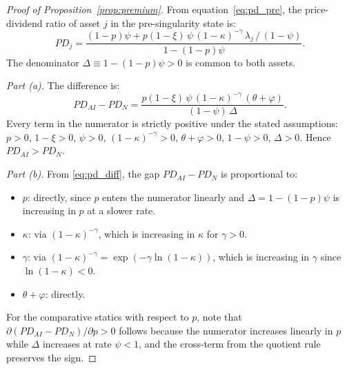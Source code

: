 \documentclass[12pt]{article}
\begin{document}
\begin{proof}[Proof of Proposition~\ref{prop:premium}]
From equation~\eqref{eq:pd_pre}, the price-dividend ratio of asset $j$ in the pre-singularity state is:
\begin{equation}
  PD_j = \frac{(1-p)\psi + p(1-\xi)\,\psi\,(1-\kappa)^{-\gamma}\,\lambda_j\,/\,(1-\psi)}{1 - (1-p)\psi}. \label{eq:pd_proof} %
\end{equation}
The denominator $\Delta \equiv 1 - (1-p)\psi > 0$ is common to both assets.

\emph{Part (a).} The difference is:
\begin{equation}
  PD_{AI} - PD_N = \frac{p(1-\xi)\,\psi\,(1-\kappa)^{-\gamma}\,(\theta + \varphi)}{(1-\psi)\,\Delta}. \label{eq:pd_diff} %
\end{equation}
Every term in the numerator is strictly positive under the stated assumptions: $p > 0$, $1-\xi > 0$, $\psi > 0$, $(1-\kappa)^{-\gamma} > 0$, $\theta + \varphi > 0$, $1 - \psi > 0$, $\Delta > 0$. Hence $PD_{AI} > PD_N$.

\emph{Part (b).} From \eqref{eq:pd_diff}, the gap $PD_{AI} - PD_N$ is proportional to:
\begin{itemize}
  \item $p$: directly, since $p$ enters the numerator linearly and $\Delta = 1 - (1-p)\psi$ is increasing in $p$ at a slower rate.
  \item $\kappa$: via $(1-\kappa)^{-\gamma}$, which is increasing in $\kappa$ for $\gamma > 0$.
  \item $\gamma$: via $(1-\kappa)^{-\gamma} = \exp(-\gamma \ln(1-\kappa))$, which is increasing in $\gamma$ since $\ln(1-\kappa) < 0$.
  \item $\theta + \varphi$: directly.
\end{itemize}
For the comparative statics with respect to $p$, note that $\partial(PD_{AI} - PD_N)/\partial p > 0$ follows because the numerator increases linearly in $p$ while $\Delta$ increases at rate $\psi < 1$, and the cross-term from the quotient rule preserves the sign.
\end{proof}
\end{document}

